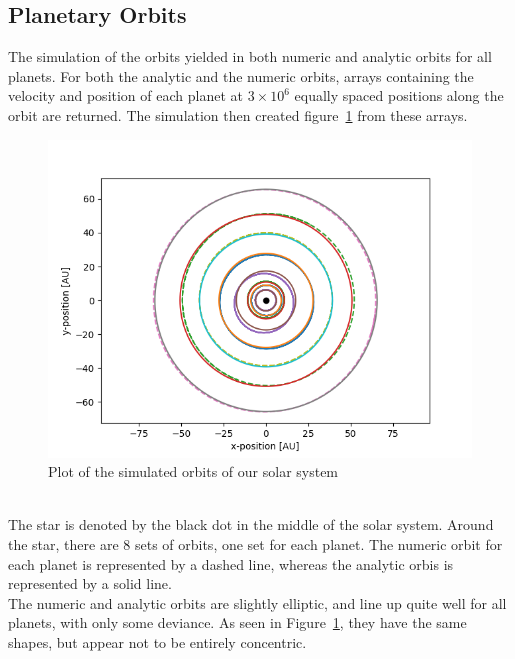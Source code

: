 \documentclass[reprint,english,notitlepage]{revtex4-2}
\begin{document}
\subsection{Planetary Orbits}
    The simulation of the orbits yielded in both numeric and analytic orbits for all planets.
	For both the analytic and the numeric orbits, arrays containing the velocity and position of each planet at $3 \times 10^6$ equally spaced positions along the orbit are returned.
	The simulation then created figure~\ref{fig:Orbit_Plot} from these arrays.
\begin{figure}[h]
	\centering
	\includegraphics[scale=0.4]{Figures/Orbit_plots}
	\caption{Plot of the simulated orbits of our solar system}\label{fig:Orbit_Plot}
\end{figure}\\
	The star is denoted by the black dot in the middle of the solar system.
	Around the star, there are 8 sets of orbits, one set for each planet.
	The numeric orbit for each planet is represented by a dashed line, whereas the analytic orbis is represented by a solid line.\\
	The numeric and analytic orbits are slightly elliptic, and line up quite well for all planets, with only some deviance.
	As seen in Figure~\ref{fig:Orbit_Plot}, they have the same shapes, but appear not to be entirely concentric.
\end{document}
